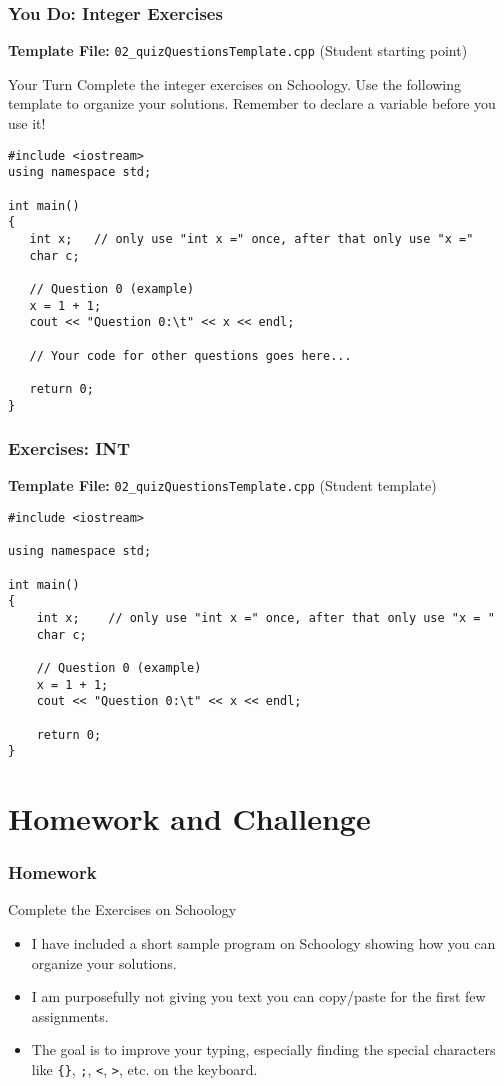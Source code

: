 \documentclass{beamer}
\begin{document}
\begin{frame}[fragile]
\frametitle{You Do: Integer Exercises}
\textbf{Template File:} \texttt{02\_quizQuestionsTemplate.cpp} (Student starting point)
\begin{block}{Your Turn}
Complete the integer exercises on Schoology. Use the following template to organize your solutions. Remember to declare a variable before you use it!
\end{block}
\begin{verbatim}
#include <iostream>
using namespace std;

int main()
{
   int x;   // only use "int x =" once, after that only use "x ="
   char c;

   // Question 0 (example)
   x = 1 + 1;
   cout << "Question 0:\t" << x << endl;

   // Your code for other questions goes here...

   return 0;
}
\end{verbatim}
\end{frame}

\begin{frame}[fragile]
\frametitle{Exercises: INT}
\textbf{Template File:} \texttt{02\_quizQuestionsTemplate.cpp} (Student template)
\begin{verbatim}
#include <iostream>

using namespace std;

int main()
{
    int x;    // only use "int x =" once, after that only use "x = "
    char c;

    // Question 0 (example)
    x = 1 + 1;
    cout << "Question 0:\t" << x << endl;

    return 0;
}
\end{verbatim}
\end{frame}

\section{Homework and Challenge}

\begin{frame}
\frametitle{Homework}
\begin{block}{Complete the Exercises on Schoology}
\begin{itemize}
    \item I have included a short sample program on Schoology showing how you can organize your solutions.
    \item I am purposefully not giving you text you can copy/paste for the first few assignments.
    \item The goal is to improve your typing, especially finding the special characters like \texttt{\{\}}, \texttt{;}, \texttt{<}, \texttt{>}, etc. on the keyboard.
\end{itemize}
\end{block}
\end{frame}
\end{document}
